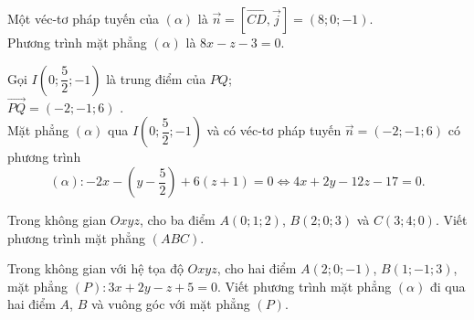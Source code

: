 \begin{bt}
{\begin{listEX}[1]
	Một véc-tơ pháp tuyến của $(\alpha)$ là $\overrightarrow{n}=\left[\overrightarrow{CD},\overrightarrow{j}\right]=(8;0;-1)$.\\
	Phương trình mặt phẳng $(\alpha)$ là  $8x-z-3=0$.
	\item Gọi $I\left(0;\dfrac{5}{2};-1\right)$ là trung điểm của $PQ$; \\
	$\overrightarrow{PQ}=(-2;-1;6)$ .\\
	Mặt phẳng $(\alpha)$ qua $I\left(0;\dfrac{5}{2};-1\right)$ và có véc-tơ pháp tuyến $\overrightarrow{n}=(-2;-1;6)$ có phương trình
	$$(\alpha)\colon -2x-\left(y-\dfrac{5}{2}\right)+6(z+1)=0\Leftrightarrow 4x+2y-12z-17=0.$$	
			\end{listEX}
	}
\end{bt}

\begin{bt}%
	Trong không gian $Oxyz$, cho ba điểm $A(0;1;2)$, $B(2;0;3)$ và $C(3;4;0)$. Viết phương trình mặt phẳng $(ABC)$.
\end{bt}

\begin{bt}%
	Trong không gian với hệ tọa độ $Oxyz$, cho hai điểm $A(2;0;-1)$, $B(1;-1;3)$, mặt phẳng $(P)\colon 3x+2y-z+5=0$. Viết phương trình mặt phẳng $(\alpha)$ đi qua hai điểm $A$, $B$ và vuông góc với mặt phẳng $(P)$.
\end{bt}


